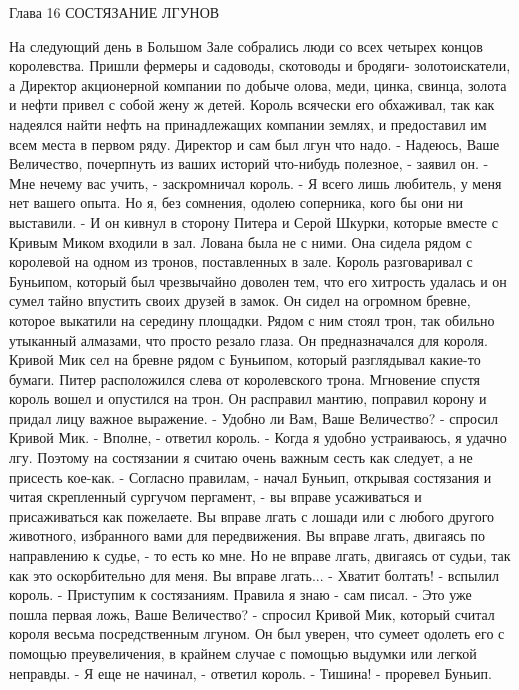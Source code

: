 Глава 16
        СОСТЯЗАНИЕ ЛГУНОВ

    На следующий день в Большом Зале собрались люди со всех четырех 
концов королевства. Пришли фермеры и садоводы, скотоводы и бродяги-
золотоискатели, а Директор акционерной компании по добыче олова, меди, 
цинка, свинца, золота и нефти привел с собой жену ж детей. Король 
всячески его обхаживал, так как надеялся найти нефть на принадлежащих 
компании землях, и предоставил им всем места в первом ряду.
    Директор и сам был лгун что надо.
    - Надеюсь, Ваше Величество, почерпнуть из ваших историй что-нибудь 
полезное, - заявил он.
    - Мне нечему вас учить, - заскромничал король. - Я всего лишь 
любитель, у меня нет вашего опыта. Но я, без сомнения, одолею 
соперника, кого бы они ни выставили. - И он кивнул в сторону Питера и 
Серой Шкурки, которые вместе с Кривым Миком входили в зал.
    Лована была не с ними. Она сидела рядом с королевой на одном из 
тронов, поставленных в зале.
    Король разговаривал с Буньипом, который был чрезвычайно доволен 
тем, что его хитрость удалась и он сумел тайно впустить своих друзей в 
замок. Он сидел на огромном бревне, которое выкатили на середину 
площадки. Рядом с ним стоял трон, так обильно утыканный алмазами, что 
просто резало глаза. Он предназначался для короля. Кривой Мик сел на 
бревне рядом с Буньипом, который разглядывал какие-то бумаги. Питер 
расположился слева от королевского трона.
    Мгновение спустя король вошел и опустился на трон. Он расправил 
мантию, поправил корону и придал лицу важное выражение.
    - Удобно ли Вам, Ваше Величество? - спросил Кривой Мик.
    - Вполне, - ответил король. - Когда я удобно устраиваюсь, я удачно 
лгу. Поэтому на состязании я считаю очень важным сесть как следует, а 
не присесть кое-как.
    - Согласно правилам, - начал Буньип, открывая состязания и читая 
скрепленный сургучом пергамент, - вы вправе усаживаться и 
присаживаться как пожелаете. Вы вправе лгать с лошади или с любого 
другого животного, избранного вами для передвижения. Вы вправе лгать, 
двигаясь по направлению к судье, - то есть ко мне. Но не вправе лгать, 
двигаясь от судьи, так как это оскорбительно для меня. Вы вправе 
лгать...
    - Хватит болтать! - вспылил король. - Приступим к состязаниям. 
Правила я знаю - сам писал.
    - Это уже пошла первая ложь, Ваше Величество? - спросил Кривой 
Мик, который считал короля весьма посредственным лгуном. Он был 
уверен, что сумеет одолеть его с помощью преувеличения, в крайнем 
случае с помощью выдумки или легкой неправды.
    - Я еще не начинал, - ответил король.
    - Тишина! - проревел Буньип.

